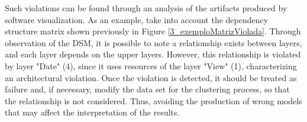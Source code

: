 \documentclass{sig-alternate-05-2015}
\begin{document}
Such violations can be found through an analysis of the artifacts produced by software visualization. As an example, take into account the dependency structure matrix shown previously in Figure \ref{3_exemploMatrizViolada}. Through observation of the DSM, it is possible to note a relationship exists between layers, and each layer depends on the upper layers. However, this relationship is violated by layer "Date" (4), since it uses resources of the layer  "View" (1), characterizing an architectural violation. Once the violation is detected, it should be treated as failure and, if necessary, modify the data set for the clustering process, so that the relationship is not considered. Thus, avoiding the production of wrong models that may affect the interpretation of the results.






\end{document}
